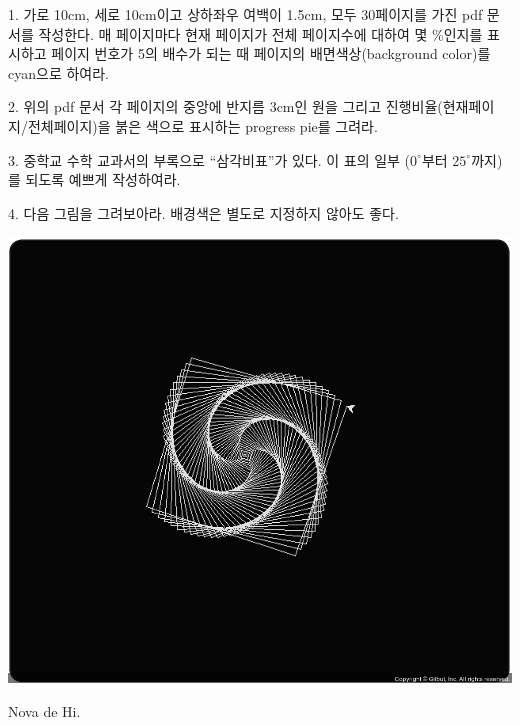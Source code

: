 \documentclass[a4paper,amsmath]{oblivoir}
\begin{document}
\begin{questionp}

 1. 가로 10cm, 세로 10cm이고 상하좌우 여백이 1.5cm, 모두 30페이지를 가진 pdf 문서를 작성한다. 매 페이지마다 현재 페이지가 전체 페이지수에 대하여 몇 \%인지를 표시하고 페이지 번호가 5의 배수가 되는 때 페이지의 배면색상(background color)를 cyan으로 하여라.

\bigskip

 2. 위의 pdf 문서 각 페이지의 중앙에 반지름 3cm인 원을 그리고 진행비율(현재페이지/전체페이지)을 붉은 색으로 표시하는 progress pie를 그려라.

\bigskip

 3. 중학교 수학 교과서의 부록으로 “삼각비표”가 있다. 이 표의 일부 ($0^\circ$부터 $25^\circ$까지)를 되도록 예쁘게 작성하여라.

\bigskip

 4. 다음 그림을 그려보아라. 배경색은 별도로 지정하지 않아도 좋다.

\includegraphics[width=.7\linewidth]{Screenshot-4}

\end{questionp}


\vfill
\hfill Nova de Hi.
\end{document}
